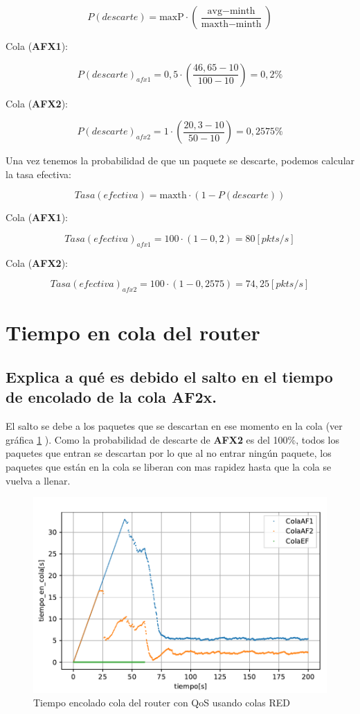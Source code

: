 \[
P(descarte) = \text{maxP} \cdot \left(\frac{\text{avg} - \text{minth}}{\text{maxth} - \text{minth}}\right)
\]

Cola (\textbf{AFX1}):

\[
P(descarte)_{afx1} = 0,5 \cdot \left(\frac{46,65 - 10}{100 - 10}\right) = 0,2\%
\]

Cola (\textbf{AFX2}):

\[
P(descarte)_{afx2} = 1 \cdot \left(\frac{20,3 - 10}{50 - 10}\right) = 0,2575\%
\]

Una vez tenemos la probabilidad de que un paquete se descarte, podemos calcular la tasa efectiva:

\[
Tasa(efectiva) = \text{maxth} \cdot (1 - P(descarte))
\]

Cola (\textbf{AFX1}): 

\[
Tasa(efectiva)_{afx1} = 100 \cdot (1 - 0,2) = 80 [pkts/s]
\]

Cola (\textbf{AFX2}):

\[
Tasa(efectiva)_{afx2} = 100 \cdot (1 - 0,2575) = 74,25 [pkts/s]
\]


\section{Tiempo en cola del router}
\subsection{Explica a qué es debido el salto en el tiempo de encolado de la cola AF2x.}

El salto se debe a los paquetes que se descartan en ese momento en la cola (ver gráfica \ref{fig:colasRED_time} ). Como la probabilidad de descarte de \textbf{AFX2} 
es del 100\%, todos los paquetes que entran se descartan por lo que al no entrar ningún paquete, los paquetes que están en la cola se liberan 
con mas rapidez hasta que la cola se vuelva a llenar.

\begin{figure}[!ht]
    \centering
    \includegraphics{graficas/RED/tiempo_en_cola_red.pdf}
    \caption{Tiempo encolado cola del router con QoS usando colas RED}
    \label{fig:colasRED_time}
\end{figure}

